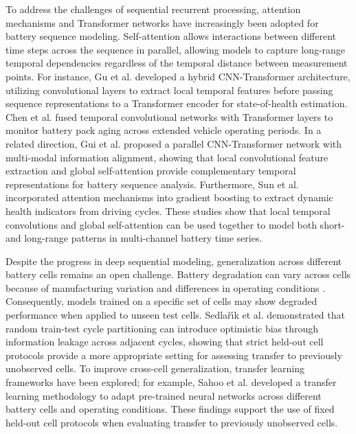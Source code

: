\documentclass[a4paper,fleqn]{cas-sc}
\begin{document}
To address the challenges of sequential recurrent processing, attention mechanisms and Transformer networks have increasingly been adopted for battery sequence modeling. Self-attention allows interactions between different time steps across the sequence in parallel, allowing models to capture long-range temporal dependencies regardless of the temporal distance between measurement points. For instance, Gu et al. \citep{cnn_transformer2023} developed a hybrid CNN-Transformer architecture, utilizing convolutional layers to extract local temporal features before passing sequence representations to a Transformer encoder for state-of-health estimation. Chen et al. \citep{tcntransformer2025} fused temporal convolutional networks with Transformer layers to monitor battery pack aging across extended vehicle operating periods. In a related direction, Gui et al. \citep{gui2025multi} proposed a parallel CNN-Transformer network with multi-modal information alignment, showing that local convolutional feature extraction and global self-attention provide complementary temporal representations for battery sequence analysis. Furthermore, Sun et al. \citep{sun2025battery} incorporated attention mechanisms into gradient boosting to extract dynamic health indicators from driving cycles. These studies show that local temporal convolutions and global self-attention can be used together to model both short- and long-range patterns in multi-channel battery time series.

Despite the progress in deep sequential modeling, generalization across different battery cells remains an open challenge. Battery degradation can vary across cells because of manufacturing variation and differences in operating conditions \citep{lu2024mechanisms}. Consequently, models trained on a specific set of cells may show degraded performance when applied to unseen test cells. Sedla{\v{r}}{\'\i}k et al. \citep{sedlavrik2025advanced} demonstrated that random train-test cycle partitioning can introduce optimistic bias through information leakage across adjacent cycles, showing that strict held-out cell protocols provide a more appropriate setting for assessing transfer to previously unobserved cells. To improve cross-cell generalization, transfer learning frameworks have been explored; for example, Sahoo et al. \citep{sahoo2022transfer} developed a transfer learning methodology to adapt pre-trained neural networks across different battery cells and operating conditions. These findings support the use of fixed held-out cell protocols when evaluating transfer to previously unobserved cells.
\end{document}
